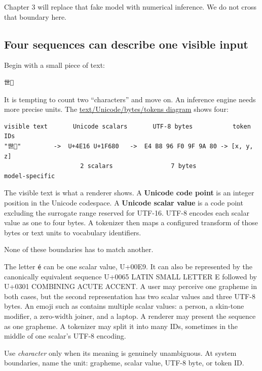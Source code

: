 \documentclass[
  10pt,
]{article}
\begin{document}
Chapter 3 will replace that fake model with numerical inference. We do
not cross that boundary here.

\subsection{Four sequences can describe one visible
input}\label{four-sequences-can-describe-one-visible-input}

Begin with a small piece of text:

\begin{verbatim}
世🚀
\end{verbatim}

It is tempting to count two ``characters'' and move on. An inference
engine needs more precise units. The
\href{https://github.com/hermonai/inside-the-llm-engine/blob/astra-visual-rewrite/diagrams/tokenizer/text-unicode-bytes-tokens.txt}{text/Unicode/bytes/tokens
diagram} shows four:

\begin{verbatim}
visible text       Unicode scalars       UTF-8 bytes           token IDs
"世🚀"         ->  U+4E16 U+1F680   ->  E4 B8 96 F0 9F 9A 80 -> [x, y, z]
                     2 scalars                7 bytes            model-specific
\end{verbatim}

The visible text is what a renderer shows. A \textbf{Unicode code point}
is an integer position in the Unicode codespace. A \textbf{Unicode
scalar value} is a code point excluding the surrogate range reserved for
UTF-16. UTF-8 encodes each scalar value as one to four bytes. A
tokenizer then maps a configured transform of those bytes or text units
to vocabulary identifiers.

None of these boundaries has to match another.

The letter \texttt{é} can be one scalar value, U+00E9. It can also be
represented by the canonically equivalent sequence U+0065 LATIN SMALL
LETTER E followed by U+0301 COMBINING ACUTE ACCENT. A user may perceive
one grapheme in both cases, but the second representation has two scalar
values and three UTF-8 bytes. An emoji such as
 contains multiple scalar values: a
person, a skin-tone modifier, a zero-width joiner, and a laptop. A
renderer may present the sequence as one grapheme. A tokenizer may split
it into many IDs, sometimes in the middle of one scalar's UTF-8
encoding.

Use \emph{character} only when its meaning is genuinely unambiguous. At
system boundaries, name the unit: grapheme, scalar value, UTF-8 byte, or
token ID.
\end{document}
